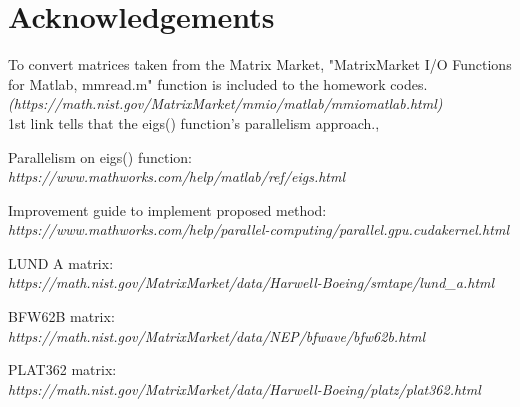 \documentclass[12pt]{article}
\begin{document}
\pagebreak

\section*{Acknowledgements}
\quad To convert matrices taken from the Matrix Market, "MatrixMarket I/O Functions for Matlab, mmread.m" function is included to the homework codes. \emph{(https://math.nist.gov/MatrixMarket/mmio/matlab/mmiomatlab.html)\\}    
\quad 1st link tells that the eigs() function's parallelism approach., 

\begin{thebibliography}{9}

Parallelism on eigs() function: \\
\emph{https://www.mathworks.com/help/matlab/ref/eigs.html}

Improvement guide to implement proposed method: \\
\emph{https://www.mathworks.com/help/parallel-computing/parallel.gpu.cudakernel.html}

LUND A matrix: \\
\emph{https://math.nist.gov/MatrixMarket/data/Harwell-Boeing/smtape/lund\_a.html}

BFW62B matrix: \\
\emph{https://math.nist.gov/MatrixMarket/data/NEP/bfwave/bfw62b.html}

PLAT362 matrix: \\
\emph{https://math.nist.gov/MatrixMarket/data/Harwell-Boeing/platz/plat362.html}

\end{thebibliography}
\end{document}
